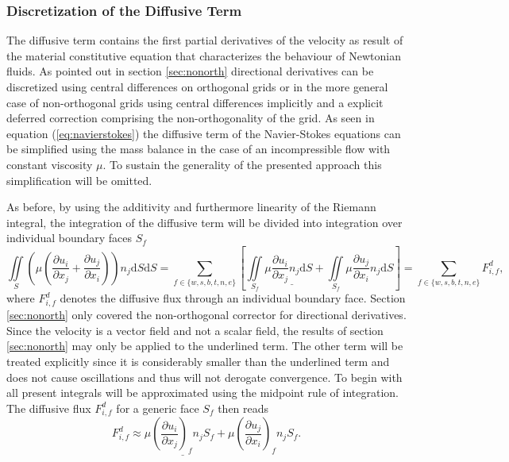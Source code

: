       \subsubsection{Discretization of the Diffusive Term}

      The diffusive term contains the first partial derivatives of the velocity as result of the material constitutive equation that characterizes the behaviour of Newtonian fluids. As pointed out in section \ref{sec:nonorth} directional derivatives can be discretized using central differences on orthogonal grids or in the more general case of non-orthogonal grids using central differences implicitly and a explicit deferred correction comprising the non-orthogonality of the grid. As seen in equation (\ref{eq:navierstokes}) the diffusive term of the Navier-Stokes equations can be simplified using the mass balance in the case of an incompressible flow with constant viscosity \(\mu\). To sustain the generality of the presented approach this simplification will be omitted.
    

      As before, by using the additivity and furthermore linearity of the Riemann integral, the integration of the diffusive term will be divided into integration over individual boundary faces \(S_f\) 
      \begin{displaymath}
      \iint\limits_S \left(\mu \left( \frac{\partial u_i}{\partial x_j} + \frac{\partial u_j}{\partial x_i}\right)\right)n_j \mathrm{d}S \mathrm{d}S
      = \sum_{f \in \{w,s,b,t,n,e\}} \left[
        \iint\limits_{S_f} \mu \underline{\frac{\partial u_i}{\partial x_j}n_j \mathrm{d}S}
    + \iint\limits_{S_f} \mu \frac{\partial u_j}{\partial x_i}n_j \mathrm{d}S \right]
       = \sum_{f \in \{w,s,b,t,n,e\}} F_{i,f}^{d},
      \end{displaymath}
      where \(F_{i,f}^{d}\) denotes the diffusive flux through an individual boundary face. Section \ref{sec:nonorth} only covered the non-orthogonal corrector for directional derivatives. Since the velocity is a vector field and not a scalar field, the results of section \ref{sec:nonorth} may only be applied to the underlined term. The other term will be treated explicitly since it is considerably smaller than the underlined term and does not cause oscillations and thus will not derogate convergence. To begin with all present integrals will be approximated using the midpoint rule of integration. The diffusive flux \(F_{i,f}^d\) for a generic face \(S_f\) then reads 
      \begin{displaymath}
        F_{i,f}^d \approx \mu \underline{\left(\frac{\partial u_i}{\partial x_j}\right)_f n_j S_f} + \mu \left(\frac{\partial u_j}{\partial x_i}\right)_f n_j S_f.
      \end{displaymath}

